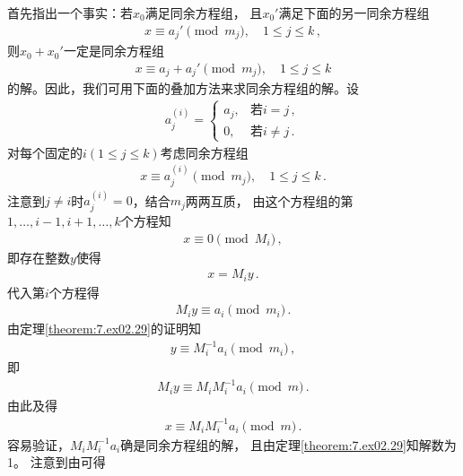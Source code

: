 \begin{prove}
    首先指出一个事实：若$x_0$满足同余方程组，
    且$x_0'$满足下面的另一同余方程组
    \begin{align}
        x\equiv a_j'\pmod{m_j},\quad 1\le j\le k\, ,
    \end{align}
    则$x_0+x_0'$一定是同余方程组
    \begin{align}
        x\equiv a_j+a_j'\pmod{m_j},\quad 1\le j\le k
    \end{align}
    的解。因此，我们可用下面的叠加方法来求同余方程组的解。设
    \begin{align}\label{eq:7.ex02.proveCRT03}
        a_j^{(i)}=\left\{\begin{array}{ll}
            a_j, & \text{若}i=j\, ,     \\
            0,   & \text{若}i\neq j\, .
        \end{array}\right.
    \end{align}
    对每个固定的$i(1\le j\le k)$考虑同余方程组
    \begin{align}\label{eq:7.ex02.proveCRT01}
        x\equiv a_j^{(i)}\pmod{m_j},\quad 1\le j\le k\, .
    \end{align}
    注意到$j\neq i$时$a_j^{(i)}=0$，结合$m_j$两两互质，
    由这个方程组的第$1,\ldots,i-1,i+1,\ldots,k$个方程知
    \begin{align}
        x\equiv0\pmod{M_i}\, ,
    \end{align}
    即存在整数$y$使得
    \begin{align}\label{eq:7.ex02.proveCRT02}
        x=M_iy\, .
    \end{align}
    代入第$i$个方程得
    \begin{align}
        M_iy\equiv a_i\pmod{m_i}\, .
    \end{align}
    由定理\ref{theorem:7.ex02.29}的证明知
    \begin{align}
        y\equiv M_i^{-1}a_i\pmod{m_i}\, ,
    \end{align}
    即
    \begin{align}
        M_iy\equiv M_iM_i^{-1}a_i\pmod{m}\, .
    \end{align}
    由此及得
    \begin{align}
        x\equiv M_iM_i^{-1}a_i\pmod{m}\, .
    \end{align}
    容易验证，$M_iM_i^{-1}a_i$确是同余方程组的解，
    且由定理\ref{theorem:7.ex02.29}知解数为1。
    注意到由可得

\end{prove}
